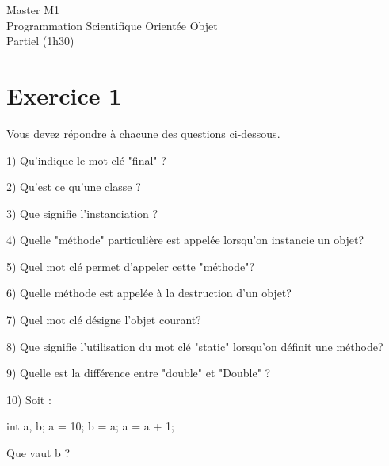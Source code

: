 \documentclass[a4paper,11pt]{article}
\begin{document}
\begin{center}
\Large{Master M1\\Programmation Scientifique Orientée Objet\\Partiel (1h30)}
\end{center}

\section*{Exercice 1}

Vous devez répondre à chacune des questions ci-dessous.

1) Qu'indique le mot clé "final" ?


2) Qu'est ce qu'une classe ?


3) Que signifie l'instanciation ?


4) Quelle "méthode" particulière est appelée lorsqu'on instancie un objet?


5) Quel mot clé permet d'appeler cette "méthode"?


6) Quelle méthode est appelée à la destruction d'un objet?


7) Quel mot clé désigne l'objet courant?


8) Que signifie l'utilisation du mot clé "static" lorsqu'on définit une méthode?


9) Quelle est la différence entre "double" et "Double" ?


10) Soit :
\begin{java}
int a, b;
a = 10;
b = a;
a = a + 1;
\end{java}

Que vaut b ?

\end{document}
